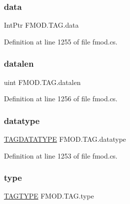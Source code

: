 \subsubsection{\texorpdfstring{data}{data}}
{\footnotesize\ttfamily Int\+Ptr F\+M\+O\+D.\+T\+A\+G.\+data}



Definition at line 1255 of file fmod.\+cs.

\mbox{\label{struct_f_m_o_d_1_1_t_a_g_a643ecb3cad6fa57ea0bd979d43a3ef4c}} 
\subsubsection{\texorpdfstring{datalen}{datalen}}
{\footnotesize\ttfamily uint F\+M\+O\+D.\+T\+A\+G.\+datalen}



Definition at line 1256 of file fmod.\+cs.

\mbox{\label{struct_f_m_o_d_1_1_t_a_g_a47a2cda512a3ad09f430bb47cdf6f2b9}} 
\subsubsection{\texorpdfstring{datatype}{datatype}}
{\footnotesize\ttfamily \hyperlink{namespace_f_m_o_d_a6268b7db79f2e91c554f4ef43aa2d62a}{T\+A\+G\+D\+A\+T\+A\+T\+Y\+PE} F\+M\+O\+D.\+T\+A\+G.\+datatype}



Definition at line 1253 of file fmod.\+cs.

\mbox{\label{struct_f_m_o_d_1_1_t_a_g_a3d73454dc0c085db653d88b5ec0e78ce}} 
\subsubsection{\texorpdfstring{type}{type}}
{\footnotesize\ttfamily \hyperlink{namespace_f_m_o_d_aa71e6eb8a2ac0e0d2c3ccb99298381bc}{T\+A\+G\+T\+Y\+PE} F\+M\+O\+D.\+T\+A\+G.\+type}



